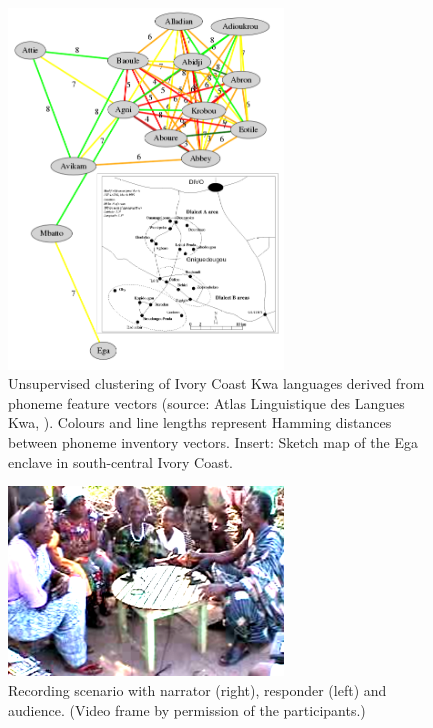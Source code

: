 \documentclass[output=paper,colorlinks,citecolor=brown
]{langscibook}
\begin{document}
\begin{figure}[ht]
\centering
\includegraphics[width=0.65\textwidth]{gibbon_figure01.png}
\vspace{-10pt}
\caption{\label{fig:fig01}Unsupervised clustering of Ivory Coast Kwa languages derived from phoneme feature vectors (source: Atlas Linguistique des Langues Kwa, \cite{herault1983}). Colours and line lengths represent Hamming distances between phoneme inventory vectors. Insert: Sketch map of the Ega enclave in south-central Ivory Coast.}
\end{figure}

\begin{figure}[ht]
\centering
\includegraphics[width=0.65\textwidth]{gibbon_figure02.png}
\caption{\label{fig:fig02}Recording scenario with narrator (right), responder (left) and audience. (Video frame by permission of the participants.)}
\end{figure}
\end{document}
